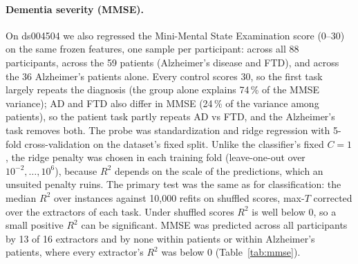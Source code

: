 \documentclass[11pt]{article}
\begin{document}
\paragraph{Dementia severity (MMSE).} On ds004504 we also regressed the Mini-Mental State
Examination score (0--30) on the same frozen features, one sample per participant: across all 88
participants, across the 59 patients (Alzheimer's disease and FTD), and across the 36 Alzheimer's
patients alone. Every control scores 30, so the first task largely repeats the diagnosis (the
group alone explains 74\,\% of the MMSE variance); AD and FTD also differ in MMSE (24\,\% of the
variance among patients), so the patient task partly repeats AD vs FTD, and the Alzheimer's task
removes both. The probe was standardization and ridge regression with 5-fold cross-validation on
the dataset's fixed split. Unlike the classifier's fixed $C = 1$, the ridge penalty was chosen in
each training fold (leave-one-out over $10^{-2}, \dots, 10^{6}$), because $R^2$ depends on the scale
of the predictions, which an unsuited penalty ruins. The primary test was the same as for
classification: the median $R^2$ over instances against 10,000 refits on shuffled scores, max-$T$
corrected over the extractors of each task. Under shuffled scores $R^2$ is well below 0, so a
small positive $R^2$ can be significant. MMSE was predicted across all participants by 13 of 16
extractors and by none within patients or within Alzheimer's patients, where every extractor's
$R^2$ was below 0 (Table~\ref{tab:mmse}).
\end{document}
